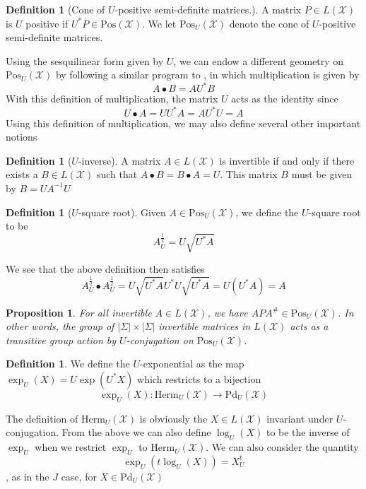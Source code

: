 \documentclass{amsart}
\numberwithin{equation}{section}
\newtheorem{proposition}[theorem]{Proposition}
\theoremstyle{definition}
\newtheorem{definition}[theorem]{Definition}
\theoremstyle{plain}
\theoremstyle{solutionstyle}
\begin{document}
\begin{definition}[Cone of $U$-positive semi-definite matrices.]
A matrix $P \in L(\mathcal{X})$ is $U$ positive if $U^*P\in \mathrm{Pos}(\mathcal{X})$\cite{bag2024quantumuchannelssspaces}. We let $\mathrm{Pos}_U(\mathcal{X})$ denote the cone of $U$-positive semi-definite matrices.

\end{definition}
Using the sesquilinear form given by $U$, we can endow a different geometry on $\mathrm{Pos}_U(\mathcal{X})$ by following a similar program to \cite{franco2026conejhermitianmatricesgeometric}, in which multiplication is given by \begin{equation*}A\bullet B=AU^*B\end{equation*} With this definition of multiplication, the matrix $U$ acts as the identity since 
\begin{equation*}U\bullet A=UU^*A=AU^*U=A\end{equation*}
Using this definition of multiplication, we may also define several other important notions 
\begin{definition}[$U$-inverse]
A matrix $A\in L(\mathcal{X})$ is invertible if and only if there exists a $B\in L(\mathcal{X})$ such that $A\bullet B=B\bullet A=U$. This matrix $B$ must be given by $B=UA^{-1}U$
\end{definition}
\begin{definition}[$U$-square root]
Given $A\in \mathrm{Pos}_U(\mathcal{X})$, we define the $U$-square root to be 
\begin{equation*}A_U^{\frac{1}{2}}=U\sqrt{U^*A}\end{equation*}
\end{definition}
We see that the above definition then satisfies 
\begin{equation*}A_U^{\frac{1}{2}}\bullet A_U^{\frac{1}{2}}=U\sqrt{U^*A}U^*U\sqrt{U^*A}=U(U^*A)=A\end{equation*}
\begin{proposition}
    For all invertible $A\in L(\mathcal{X})$, we have $APA^\#\in \mathrm{Pos}_U(\mathcal{X})$. In other words, the group of $|\Sigma|\times |\Sigma|$ invertible matrices in $L(\mathcal{X})$ acts as a transitive group action by $U$-conjugation on $\mathrm{Pos}_{U}(\mathcal{X})$. 
\end{proposition}

\begin{definition}
    We define the $U$-exponential as the map 
    $\exp_U(X)=U\exp(U^*X)$ which restricts to a bijection 
    \begin{equation*}\exp_U(X):\mathrm{Herm}_U(\mathcal{X})\to \mathrm{Pd}_U(\mathcal{X})\end{equation*}
\end{definition}
The definition of $\mathrm{Herm}_U(\mathcal{X})$ is obviously the $X\in L(\mathcal{X})$ invariant under $U$-conjugation. From the above we can also define $\log_U(X)$ to be the inverse of $\exp_U$ when we restrict $\exp_U$ to $\mathrm{Herm}_U(\mathcal{X})$. We can also consider the quantity \begin{equation*}\exp_U(t\log_U(X))=X_U^t\end{equation*}, as in the $J$ case, for $X\in \mathrm{Pd}_U(\mathcal{X})$
\end{document}
